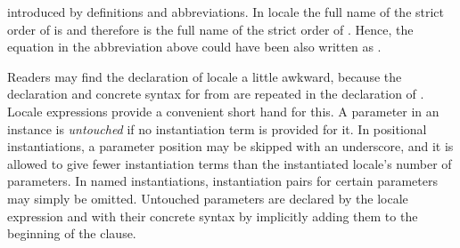 \begin{isabellebody}
\begin{isamarkuptext}
  introduced by definitions and abbreviations.  In locale
   the full name of the strict order of \isa{{\isasymsqsubseteq}} is
   and therefore  is the full name of
  the strict order of \isa{{\isasympreceq}}.  Hence, the equation in the
  abbreviation above could have been also written as .%
\end{isamarkuptext}%
\isamarkuptrue%
%
\begin{isamarkuptext}%
Readers may find the declaration of locale  a little awkward, because the declaration and
  concrete syntax for  from  are
  repeated in the declaration of .  Locale
  expressions provide a convenient short hand for this.  A parameter
  in an instance is \emph{untouched} if no instantiation term is
  provided for it.  In positional instantiations, a parameter position
  may be skipped with an underscore, and it is allowed to give fewer
  instantiation terms than the instantiated locale's number of
  parameters.  In named instantiations, instantiation pairs for
  certain parameters may simply be omitted.  Untouched parameters are
  declared by the locale expression and with their concrete syntax by
  implicitly adding them to the beginning of the 
  clause.


\end{isamarkuptext}
\end{isabellebody}
